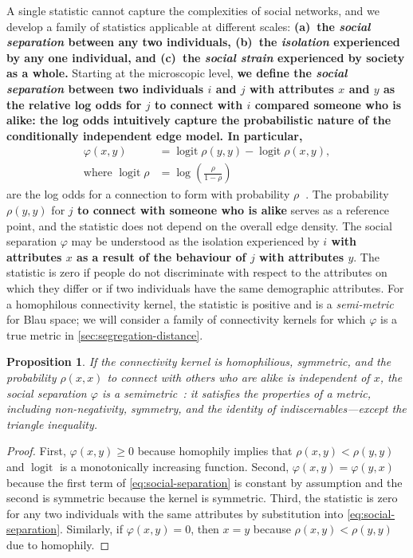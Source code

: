 \documentclass{scrartcl}
\DeclareMathOperator{\logit}{logit}
\newtheorem{prop}{Proposition}
\newcommand{\change}[1]{\textbf{#1}}
\begin{document}
\begin{refsection}
A single statistic cannot capture the complexities of social networks, and we develop a family of statistics applicable at different scales: \change{(a)~the \emph{social separation} between any two individuals, (b)~the \emph{isolation} experienced by any one individual, and (c)~the \emph{social strain} experienced by society as a whole.} Starting at the microscopic level, \change{we define the \emph{social separation} between two individuals $i$ and $j$ with attributes $x$ and $y$ as the relative log odds for $j$ to connect with $i$ compared someone who is alike: the log odds intuitively capture the probabilistic nature of the conditionally independent edge model. In particular,}
\begin{align}
    \varphi(x, y) &= \logit \rho(y,y) - \logit\rho(x,y),\label{eq:social-separation}\\
    \text{where }\logit\rho &= \log\left(\frac{\rho}{1-\rho}\right)\nonumber
\end{align}
are the log odds for a connection to form with probability $\rho$\change{~\cite{Hastie2009}}. The probability $\rho(y, y)$ for \change{$j$ to connect with someone who is alike} serves as a reference point, and the statistic does not depend on the overall edge density. The social separation $\varphi$ may be understood as the isolation experienced by \change{$i$ with attributes $x$ as a result of the behaviour of $j$ with attributes $y$}. The statistic is zero if people do not discriminate with respect to the attributes on which they differ or if two individuals have the same demographic attributes. For a homophilous connectivity kernel, the statistic is positive and is a \emph{semi-metric} for Blau space; we will consider a family of connectivity kernels for which $\varphi$ is a true metric in \cref{sec:segregation-distance}.

\begin{prop}\label{prop:segregations-semi-metric}
    If the connectivity kernel is homophilious, symmetric, and the probability $\rho(x,x)$ to connect with others who are alike is independent of $x$, the social separation $\varphi$ is a \emph{semimetric}~\cite{Wilson1931}: it satisfies the properties of a metric, including non-negativity, symmetry, and the identity of indiscernables---except the triangle inequality.
\end{prop}
\begin{proof}
    First, $\varphi(x,y)\geq0$ because homophily implies that $\rho(x, y)<\rho(y, y)$ and $\logit$ is a monotonically increasing function. Second, $\varphi(x,y)=\varphi(y,x)$ because the first term of \cref{eq:social-separation} is constant by assumption and the second is symmetric because the kernel is symmetric. Third, the statistic is zero for any two individuals with the same attributes by substitution into \cref{eq:social-separation}. Similarly, if $\varphi(x,y)=0$, then $x=y$ because $\rho(x, y)<\rho(y, y)$ due to homophily.
\end{proof}


\end{refsection}
\end{document}
